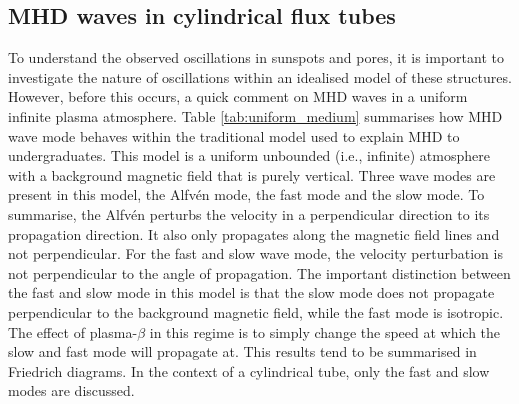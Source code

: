 \subsection{MHD waves in cylindrical flux tubes}

    To understand the observed oscillations in sunspots and pores, it is important to investigate the nature of oscillations within an idealised model of these structures.
    However, before this occurs, a quick comment on MHD waves in a uniform infinite plasma atmosphere.
    Table \ref{tab:uniform_medium} summarises how MHD wave mode behaves within the traditional model used to explain MHD to undergraduates.
    This model is a uniform unbounded (i.e., infinite) atmosphere with a background magnetic field that is purely vertical.
    Three wave modes are present in this model, the Alfv\'{e}n mode, the fast mode and the slow mode.
    To summarise, the Alfv\'{e}n perturbs the velocity in a perpendicular direction to its propagation direction. 
    It also only propagates along the magnetic field lines and not perpendicular.
    For the fast and slow wave mode, the velocity perturbation is not perpendicular to the angle of propagation.
    The important distinction between the fast and slow mode in this model is that the slow mode does not propagate perpendicular to the background magnetic field, while the fast mode is isotropic.
    The effect of plasma-$\beta$ in this regime is to simply change the speed at which the slow and fast mode will propagate at.  
    This results tend to be summarised in Friedrich diagrams. 
    In the context of a cylindrical tube, only the fast and slow modes are discussed.
             
